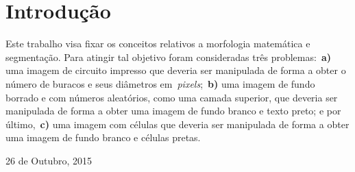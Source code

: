 \documentclass[conference]{Trabalho_2}
\begin{document}





%
\IEEEpeerreviewmaketitle



\section{Introdu\c{c}\~ao}
Este trabalho visa fixar os conceitos relativos a morfologia matem\'atica e segmenta\c{c}\~ao. Para atingir tal objetivo foram consideradas tr\^es problemas:~\textbf{a)} uma imagem de circuito impresso que deveria ser manipulada de forma a obter o n\'umero de buracos e seus di\^ametros em~\textit{pixels};~\textbf{b)} uma imagem de fundo borrado e com n\'umeros aleat\'orios, como uma camada superior, que deveria ser manipulada de forma a obter uma imagem de fundo branco e texto preto; e por \'ultimo,~\textbf{c)} uma imagem com c\'elulas que deveria ser manipulada de forma a obter uma imagem de fundo branco e c\'elulas pretas.

 
\hfill 26 de Outubro, 2015


%
%
\end{document}
